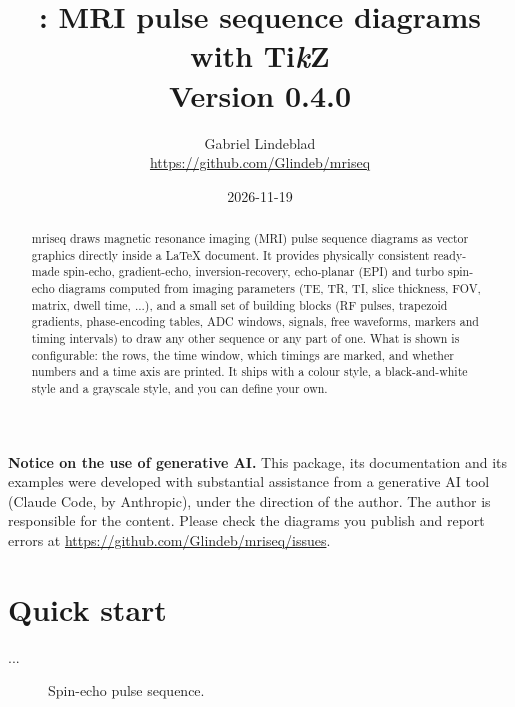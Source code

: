 \documentclass[11pt]{article}
\title{\pkg{mriseq}: MRI pulse sequence diagrams with Ti\emph{k}Z\\[2pt]
  \large Version 0.4.0}
\author{Gabriel Lindeblad\\\small\url{https://github.com/Glindeb/mriseq}}
\date{2026-11-19}
\newcommand\pkg[1]{\textsf{#1}}
\begin{document}
\sloppy
\maketitle

\begin{abstract}\noindent
\pkg{mriseq} draws magnetic resonance imaging (MRI) pulse sequence diagrams as
vector graphics directly inside a \LaTeX{} document. It provides physically
consistent ready-made spin-echo, gradient-echo, inversion-recovery, echo-planar
(EPI) and turbo spin-echo diagrams
computed from imaging parameters (TE, TR, TI, slice thickness, FOV, matrix,
dwell time, ...), and a small set of building blocks (RF pulses, trapezoid
gradients, phase-encoding tables, ADC windows, signals, free waveforms, markers
and timing intervals) to draw any other sequence or any part of one.
What is shown is configurable: the rows, the time window, which timings are
marked, and whether numbers and a time axis are printed. It ships with a colour
style, a black-and-white style and a grayscale style, and you can define your own.
\end{abstract}

\begin{center}
\begin{minipage}{0.9\linewidth}\small
\textbf{Notice on the use of generative AI.} This package, its documentation and
its examples were developed with substantial assistance from a generative AI tool
(Claude Code, by Anthropic), under the direction of the author. The author is
responsible for the content. Please check the diagrams you publish and report
errors at \url{https://github.com/Glindeb/mriseq/issues}.
\end{minipage}
\end{center}

\tableofcontents

\section{Quick start}

\begin{exampleonly}
\usepackage{mriseq}            %
...
\begin{figure}
  \centering
  \SpinEchoDiagram
  \caption{Spin-echo pulse sequence.}
\end{figure}
\end{exampleonly}
\end{document}
